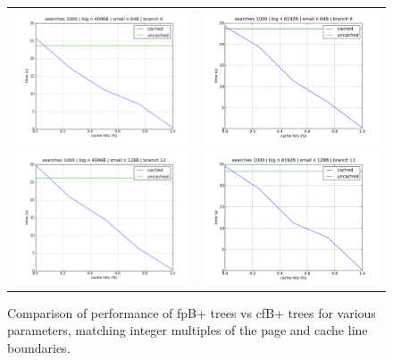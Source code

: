 \documentclass{article}
\begin{document}
\begin{figure}[h]
\begin{tabular}{l l}
\includegraphics[width=250pt]{4096_64_6} &
\includegraphics[width=250pt]{8192_64_6} \\
\includegraphics[width=250pt]{4096_128_12} &
\includegraphics[width=250pt]{8192_128_12} \\
\end{tabular}
\caption{
Comparison of performance of fpB+ trees vs cfB+ trees for various parameters,
matching integer multiples of the page and cache line boundaries.
}
\label{fig:cachehits1}
\end{figure}
\end{document}
